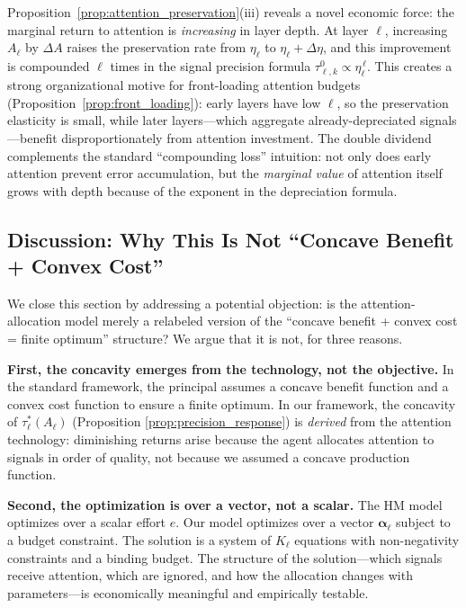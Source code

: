 \begin{remark}\label{rem:double_dividend}
Proposition~\ref{prop:attention_preservation}(iii) reveals a novel economic force: the marginal return to attention is \emph{increasing} in layer depth. At layer $\ell$, increasing $A_\ell$ by $\Delta A$ raises the preservation rate from $\eta_\ell$ to $\eta_\ell + \Delta \eta$, and this improvement is compounded $\ell$ times in the signal precision formula $\tau^0_{\ell,k} \propto \eta_\ell^{\,\ell}$. This creates a strong organizational motive for front-loading attention budgets (Proposition~\ref{prop:front_loading}): early layers have low $\ell$, so the preservation elasticity is small, while later layers---which aggregate already-depreciated signals---benefit disproportionately from attention investment. The double dividend complements the standard ``compounding loss'' intuition: not only does early attention prevent error accumulation, but the \emph{marginal value} of attention itself grows with depth because of the exponent in the depreciation formula.
\end{remark}

\subsection{Discussion: Why This Is Not ``Concave Benefit + Convex Cost''}
\label{subsec:not_concave_convex}

We close this section by addressing a potential objection: is the attention-allocation model merely a relabeled version of the ``concave benefit + convex cost = finite optimum'' structure? We argue that it is not, for three reasons.

\textbf{First, the concavity emerges from the technology, not the objective.} In the standard framework, the principal assumes a concave benefit function and a convex cost function to ensure a finite optimum. In our framework, the concavity of $\tau^*_\ell(A_\ell)$ (Proposition \ref{prop:precision_response}) is \emph{derived} from the attention technology: diminishing returns arise because the agent allocates attention to signals in order of quality, not because we assumed a concave production function.

\textbf{Second, the optimization is over a vector, not a scalar.} The HM model optimizes over a scalar effort $e$. Our model optimizes over a vector $\boldsymbol{\alpha}_\ell$ subject to a budget constraint. The solution is a system of $K_\ell$ equations with non-negativity constraints and a binding budget. The structure of the solution---which signals receive attention, which are ignored, and how the allocation changes with parameters---is economically meaningful and empirically testable.

